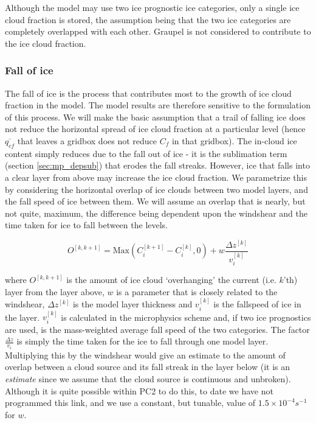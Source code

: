 \documentclass{UMDP_article}
\begin{document}
Although the model may use two ice prognostic ice categories, only
a single ice cloud fraction is stored, the assumption being that the
two ice categories are completely overlapped with each other. Graupel
is not considered to contribute to the ice cloud fraction.

\subsubsection{Fall of ice}
\label{sec:lsp_fall}

The fall of ice is the process that contributes most to the growth of
ice cloud fraction in the model. The model results are therefore sensitive
to the formulation of this process. We will make the basic assumption
that a trail of falling ice does not reduce the horizontal spread of
ice cloud fraction at a particular level (hence $\overline{q_{cf}}$
that leaves a gridbox does not reduce $C_f$ in that gridbox). The in-cloud
ice content simply reduces due to the fall out of ice - it is the
sublimation term (section \ref{sec:mp_depsub}) that erodes the fall streaks.
However, ice that falls into a clear layer from above may increase
the ice cloud fraction. We parametrize this by considering the
horizontal overlap of ice clouds between two model layers, and the
fall speed of ice between them. We will assume an overlap that
is nearly, but not quite, maximum, the difference being dependent
upon the windshear and the time taken for ice to fall between the
levels.

\begin{equation}
O^{[k,k+1]} = \text{Max}( C_{i}^{[k+1]} - C_i^{[k]}  , 0)
+ w \frac{\Delta z^{[k]}}{v_i^{[k]}}
\label{eq:overhang}
\end{equation}

where $O^{[k,k+1]}$ is the amount of ice cloud `overhanging' the current
(i.e. $k$'th) layer
from the layer above, $w$ is a parameter that is closely related to the
windshear, $\Delta z^{[k]}$ is the model layer thickness and $v_i^{[k]}$ is
the fallspeed of ice in the layer. $v_i^{[k]}$ is calculated in the microphysics
scheme and, if two ice prognostics are used, is the mass-weighted average fall
speed of the two categories.
The factor $\frac{\Delta z}{v_i}$ is simply the time
taken for the ice to fall through one model layer. Multiplying this
by the windshear would give an estimate to the amount
of overlap between a cloud source and its fall streak in the layer
below (it is an \textit{estimate} since we assume that the cloud
source is continuous and unbroken). Although it is quite possible within
PC2 to do this, to date we have not programmed this link, and we
use a constant, but tunable, value of $1.5 \times 10^{-4} s^{-1}$ for $w$.
\end{document}
